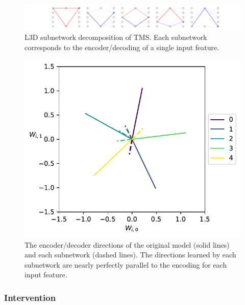 \documentclass{article}
\theoremstyle{plain}
\theoremstyle{definition}
\theoremstyle{remark}
\begin{document}
\begin{figure}
    \centerline{\includegraphics[width=\textwidth]{../figures/3_tms_first_5_subnetworks.pdf}}
    \centering
    \caption{L3D subnetwork decomposition of TMS. Each subnetwork corresponds to the encoder/decoding of a single input feature.}\label{fig:3_tms_subnetworks_first5}
\end{figure}

\begin{figure}
    \centerline{\includegraphics[width=\columnwidth]{../figures/s2_tms_encoder_directions.pdf}}
    \centering
    \caption{The encoder/decoder directions of the original model (solid lines) and each subnetwork (dashed lines). The directions learned by each subnetwork are nearly perfectly parallel to the encoding for each input feature.}\label{fig:s2_tms_encoder_directions}
\end{figure}

\subsubsection{Intervention}
\end{document}
